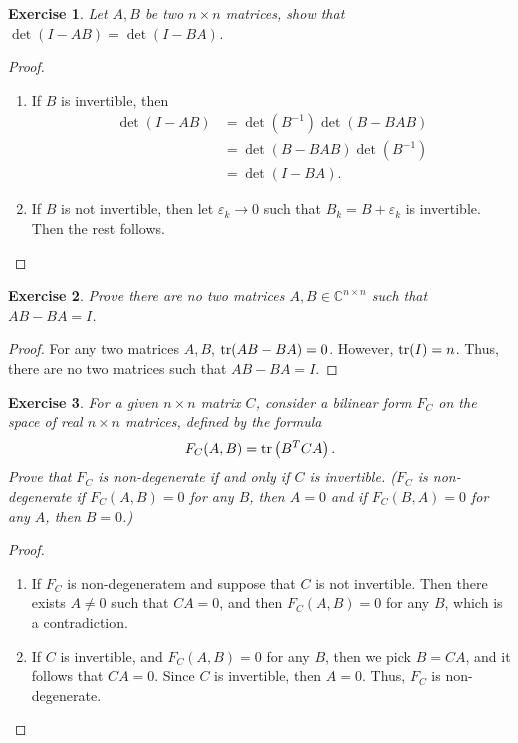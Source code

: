 \documentclass[11pt]{book}
\newtheorem{exercise}{Exercise}[section]
\theoremstyle{definition}
\numberwithin{equation}{chapter}
\begin{document}
\medskip

\begin{exercise}
Let $A, B$ be two $n \times n$ matrices, show that $\det (I - AB) = \det (I - BA)$.
\end{exercise}
\begin{proof}
~\begin{enumerate}[label=(\alph*)]
    \item If $B$ is invertible, then 
    \begin{align*}
        \det (I - AB) & = \det \left(B^{-1}\right) \det (B - BAB) \\
        & = \det (B - BAB) \det \left(B^{-1}\right) \\
        & = \det (I - BA).
    \end{align*}
    
    \item If $B$ is not invertible, then let $\varepsilon_k \to 0$ such that $B_k = B + \varepsilon_k$ is invertible. Then the rest follows.
\end{enumerate}
\end{proof}

\medskip

\begin{exercise}
Prove there are no two matrices $A, B \in \mathbb{C}^{n \times n}$ such that $AB - BA = I${\rm \cite{19}}. 
\end{exercise}
\begin{proof}
For any two matrices $A, B$, ${\rm tr}(AB - BA) = 0$\cite{20}. However, ${\rm tr} (I) = n$. Thus, there are no two matrices such that $AB - BA = I$.
\end{proof}

\medskip

\begin{exercise}{\bf *}
For a given $n \times n$ matrix $C$, consider a bilinear form $F_C$ on the space of real $n \times n$ matrices, defined by the formula 
\begin{align*}
    F_C(A, B) = {\rm tr} \left(B^T C A\right).
\end{align*}
Prove that $F_C$ is non-degenerate if and only if $C$ is invertible. ($F_C$ is non-degenerate if $F_C(A,B) = 0$ for any $B$, then $A = 0$ and if $F_C(B,A) = 0$ for any $A$, then $B = 0$.)
\end{exercise}
\begin{proof}
~\begin{enumerate}[label=(\alph*)]
    \item If $F_C$ is non-degeneratem and suppose that $C$ is not invertible. Then there exists $A \neq 0$ such that $CA = 0$, and then $F_C(A,B) = 0$ for any $B$, which is a contradiction.
    
    \item If $C$ is invertible, and $F_C(A, B) = 0$ for any $B$, then we pick $B = CA$, and it follows that $CA = 0$. Since $C$ is invertible, then $A = 0$. Thus, $F_C$ is non-degenerate.
\end{enumerate}
\end{proof}
\end{document}
